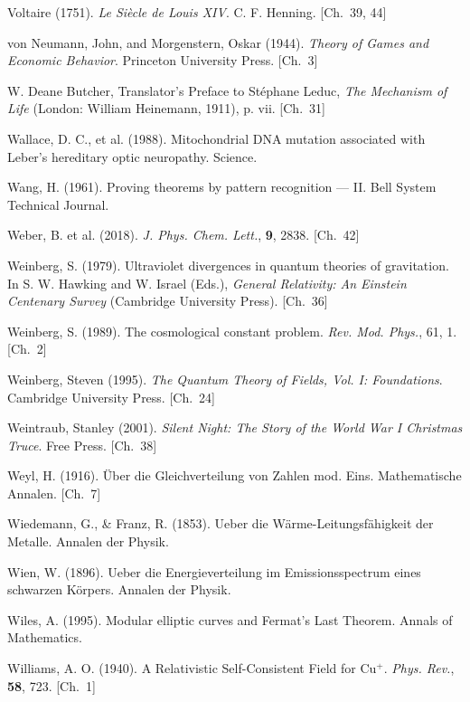 \begin{list}{}{%
  \setlength{\leftmargin}{2em}%
  \setlength{\itemindent}{-2em}%
  \setlength{\itemsep}{0.35\baselineskip}%
  \setlength{\parsep}{0pt}%
  \setlength{\topsep}{0.5em}}
\item Voltaire (1751). \textit{Le Siècle de Louis XIV}. C. F. Henning. \hfill {\scriptsize [Ch.~39, 44]}
\item von Neumann, John, and Morgenstern, Oskar (1944). \textit{Theory of Games and Economic Behavior}. Princeton University Press. \hfill {\scriptsize [Ch.~3]}
\item W. Deane Butcher, Translator's Preface to Stéphane Leduc, \textit{The Mechanism of Life} (London: William Heinemann, 1911), p. vii. \hfill {\scriptsize [Ch.~31]}
\item Wallace, D. C., et al. (1988). Mitochondrial DNA mutation associated with Leber's hereditary optic neuropathy. Science.
\item Wang, H. (1961). Proving theorems by pattern recognition — II. Bell System Technical Journal.
\item Weber, B. et al. (2018). \textit{J. Phys. Chem. Lett.}, \textbf{9}, 2838. \hfill {\scriptsize [Ch.~42]}
\item Weinberg, S. (1979). Ultraviolet divergences in quantum theories of gravitation. In S. W. Hawking and W. Israel (Eds.), \textit{General Relativity: An Einstein Centenary Survey} (Cambridge University Press). \hfill {\scriptsize [Ch.~36]}
\item Weinberg, S. (1989). The cosmological constant problem. \textit{Rev. Mod. Phys.}, 61, 1. \hfill {\scriptsize [Ch.~2]}
\item Weinberg, Steven (1995). \textit{The Quantum Theory of Fields, Vol. I: Foundations}. Cambridge University Press. \hfill {\scriptsize [Ch.~24]}
\item Weintraub, Stanley (2001). \textit{Silent Night: The Story of the World War I Christmas Truce}. Free Press. \hfill {\scriptsize [Ch.~38]}
\item Weyl, H. (1916). Über die Gleichverteilung von Zahlen mod. Eins. Mathematische Annalen. \hfill {\scriptsize [Ch.~7]}
\item Wiedemann, G., \& Franz, R. (1853). Ueber die Wärme-Leitungsfähigkeit der Metalle. Annalen der Physik.
\item Wien, W. (1896). Ueber die Energieverteilung im Emissionsspectrum eines schwarzen Körpers. Annalen der Physik.
\item Wiles, A. (1995). Modular elliptic curves and Fermat's Last Theorem. Annals of Mathematics.
\item Williams, A. O. (1940). A Relativistic Self-Consistent Field for Cu\(^+\). \textit{Phys. Rev.}, \textbf{58}, 723. \hfill {\scriptsize [Ch.~1]}

\end{list}
